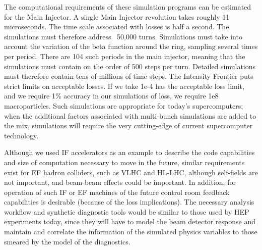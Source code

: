 The computational requirements of these simulation programs can
be estimated for the Main Injector. A single Main Injector
revolution takes roughly 11 microseconds. The time scale
associated with losses is half a second. The simulations must
therefore address ~50,000 turns. Simulations must take into
account the variation of the beta function around the ring,
sampling several times per period. There are 104 such periods in
the main injector, meaning that the simulations must contain on
the order of 500 steps per turn. Detailed simulations must
therefore contain tens of millions of time steps. The Intensity
Frontier puts strict limits on acceptable losses. If we take 1e-4
has the acceptable loss limit, and we require 1\% accuracy in our
simulations of loss, we require 1e8 macroparticles. Such
simulations are appropriate for today's supercomputers; when the
additional factors associated with multi-bunch simulations are
added to the mix, simulations will require the very cutting-edge
of current supercomputer technology.

Although we used IF accelerators as an example to
describe the code capabilities and size of computation necessary to move in the
future, similar requirements exist for EF hadron colliders, such as VLHC and 
HL-LHC, although self-fields are not important, and beam-beam effects could be
important.  In addition, for operation of such IF or EF machines of the future
control room feedback capabilities is desirable (because of the loss 
implications).  The necessary analysis workflow
and synthetic diagnostic tools would be similar to those used by HEP
experiments today, since they will have to model the beam detector
response and maintain and correlate the information of the
simulated physics variables to those smeared by the model of the
diagnostics. 

